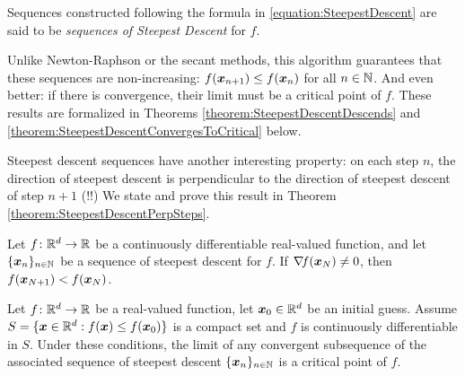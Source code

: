 \begin{remark}
Sequences constructed following the formula in \eqref{equation:SteepestDescent} are said to be \emph{sequences of Steepest Descent} for $f$.

Unlike Newton-Raphson or the secant methods, this algorithm guarantees that these sequences are non-increasing: $f(\boldsymbol{x}_{n+1}) \leq f(\boldsymbol{x}_n)$ for all $n \in \mathbb{N}$.  And even better: if there is convergence, their limit must be a critical point of $f$.  These results are formalized in Theorems \ref{theorem:SteepestDescentDescends} and \ref{theorem:SteepestDescentConvergesToCritical}  below.

Steepest descent sequences have another interesting property: on each step $n$, the direction of steepest descent is perpendicular to the direction of steepest descent of step $n+1$ (!!)  We state and prove this result in Theorem \ref{theorem:SteepestDescentPerpSteps}.
\end{remark}

\begin{theorem}\label{theorem:SteepestDescentDescends}
Let $f\colon \mathbb{R}^d \to \mathbb{R}$ be a continuously differentiable real-valued function, and let $\{ \boldsymbol{x}_n \}_{n\in\mathbb{N}}$ be a sequence of steepest descent for $f$.  If $\mathop{\nabla\! {f}}(\boldsymbol{x}_N) \neq 0$, then $f(\boldsymbol{x}_{N+1}) < f(\boldsymbol{x}_N)$.
\end{theorem}

\begin{theorem}\label{theorem:SteepestDescentConvergesToCritical}
Let $f\colon \mathbb{R}^d \to \mathbb{R}$ be a real-valued function, let $\boldsymbol{x}_0 \in \mathbb{R}^d$ be an initial guess.  Assume $S = \{ \boldsymbol{x} \in \mathbb{R}^d :  f(\boldsymbol{x}) \leq f(\boldsymbol{x}_0) \}$ is a compact set and $f$ is continuously differentiable in $S$.  Under these conditions, the limit of any convergent subsequence of the associated sequence of steepest descent $\{ \boldsymbol{x}_n \}_{n\in \mathbb{N}}$ is a critical point of $f$.
\end{theorem}

